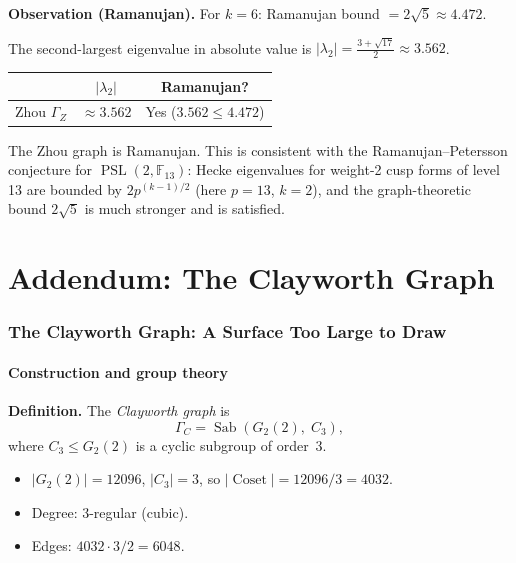 \documentclass[11pt,a4paper]{article}
\theoremstyle{plain}
\theoremstyle{definition}
\newcommand{\Sab}{\operatorname{Sab}}
\newcommand{\PSL}{\operatorname{PSL}}
\begin{document}
\begin{tcolorbox}[breakable, colback=yellow!12, colframe=yellow!12,
  boxrule=0pt, sharp corners]
\textbf{Observation (Ramanujan).}
For $k=6$: Ramanujan bound $= 2\sqrt{5} \approx 4.472$.

The second-largest eigenvalue in absolute value is $|\lambda_2| = \frac{3+\sqrt{17}}{2}
\approx 3.562$.

\begin{center}
\begin{tabular}{lcc}
\toprule
& $|\lambda_2|$ & Ramanujan? \\
\midrule
Zhou $\Gamma_Z$ & $\approx 3.562$ & Yes ($3.562 \leq 4.472$) \\
\bottomrule
\end{tabular}
\end{center}

The Zhou graph is Ramanujan. This is consistent with the Ramanujan--Petersson
conjecture for $\PSL(2,\mathbb{F}_{13})$: Hecke eigenvalues for weight-2
cusp forms of level 13 are bounded by $2p^{(k-1)/2}$ (here $p = 13$, $k=2$),
and the graph-theoretic bound $2\sqrt{5}$ is much stronger and is satisfied.
\end{tcolorbox}

\part*{Addendum: The Clayworth Graph}

\section{The Clayworth Graph: A Surface Too Large to Draw}

\subsection{Construction and group theory}

\begin{tcolorbox}[breakable, colback=green!8, colframe=green!8,
  boxrule=0pt, sharp corners]
\textbf{Definition.} The \emph{Clayworth graph} is
\[
\Gamma_C = \Sab\!\left(G_2(2),\; C_3\right),
\]
where $C_3 \leq G_2(2)$ is a cyclic subgroup of order~3.
\begin{itemize}
\item $|G_2(2)| = 12096$, $|C_3| = 3$, so $|\operatorname{Coset}| = 12096/3 = 4032$.
\item Degree: 3-regular (cubic).
\item Edges: $4032 \cdot 3 / 2 = 6048$.
\end{itemize}
\end{tcolorbox}
\end{document}
